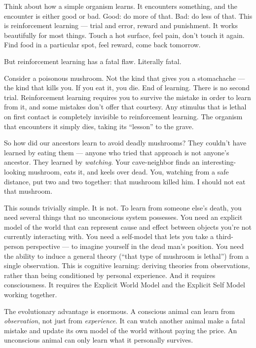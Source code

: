 \documentclass[11pt, twoside, openright]{book}
\begin{document}
Think about how a simple organism learns. It encounters something, and the encounter is either good or bad. Good: do more of that. Bad: do less of that. This is reinforcement learning --- trial and error, reward and punishment. It works beautifully for most things. Touch a hot surface, feel pain, don't touch it again. Find food in a particular spot, feel reward, come back tomorrow.

But reinforcement learning has a fatal flaw. Literally fatal.

Consider a poisonous mushroom. Not the kind that gives you a stomachache --- the kind that kills you. If you eat it, you die. End of learning. There is no second trial. Reinforcement learning requires you to survive the mistake in order to learn from it, and some mistakes don't offer that courtesy. Any stimulus that is lethal on first contact is completely invisible to reinforcement learning. The organism that encounters it simply dies, taking its ``lesson'' to the grave.

So how did our ancestors learn to avoid deadly mushrooms? They couldn't have learned by eating them --- anyone who tried that approach is not anyone's ancestor. They learned by \textit{watching}. Your cave-neighbor finds an interesting-looking mushroom, eats it, and keels over dead. You, watching from a safe distance, put two and two together: that mushroom killed him. I should not eat that mushroom.

This sounds trivially simple. It is not. To learn from someone else's death, you need several things that no unconscious system possesses. You need an explicit model of the world that can represent cause and effect between objects you're not currently interacting with. You need a self-model that lets you take a third-person perspective --- to imagine yourself in the dead man's position. You need the ability to induce a general theory (``that type of mushroom is lethal'') from a single observation. This is cognitive learning: deriving theories from observations, rather than being conditioned by personal experience. And it requires consciousness. It requires the Explicit World Model and the Explicit Self Model working together.

The evolutionary advantage is enormous. A conscious animal can learn from \textit{observation}, not just from \textit{experience}. It can watch another animal make a fatal mistake and update its own model of the world without paying the price. An unconscious animal can only learn what it personally survives.
\end{document}
